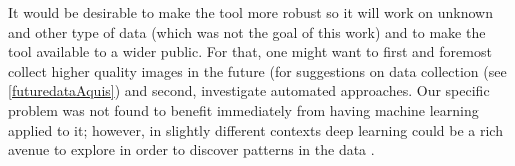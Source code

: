 







It would be desirable to make the tool more robust so it will work on unknown and other type of data (which was not the goal of this work) and to make the tool available to a wider public. For that, one might want to first and foremost collect higher quality images in the future (for suggestions on data collection (see \ref{futuredataAquis}) and second, investigate automated approaches. %
Our specific problem was not found to benefit immediately from having machine learning applied to it; however, in slightly different contexts deep learning could be a rich avenue to explore in order to discover patterns in the data \cite{pound2017deep,lee2018automated}.






